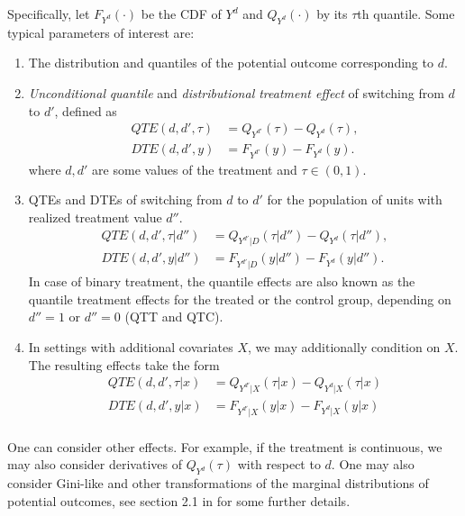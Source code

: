 Specifically, let $F_{Y^d}(\cdot)$ be the CDF of $Y^d$ and   $Q_{Y^d}(\cdot)$ by its   $\tau$th quantile.  Some typical parameters of interest are: 
 \begin{enumerate}
 	\item The distribution and quantiles of the potential outcome corresponding to $d$.
 	\item \emph{Unconditional}  \emph{quantile}  and \emph{distributional  treatment effect} of switching from $d$ to $d'$, defined as
 	\begin{align}
 		QTE(d, d', \tau ) &  =Q_{Y^{d'}}(\tau) - 	Q_{Y^d}(\tau) ,\\
 			DTE(d, d', y) & = F_{Y^{d'}}(y) - F_{Y^d}(y). 
 	\end{align}
 	where $d, d'$ are some values of the treatment and $\tau\in (0, 1)$. 
 	
 	\item  QTEs and DTEs  of switching from $d$ to $d'$ for the population of units with realized treatment value $d''$. 
 	 	\begin{align}
 		QTE(d, d', \tau|d'') &  =Q_{Y^{d'}|D}(\tau|d'') - 	Q_{Y^d}(\tau|d'') ,\\
 		DTE(d, d', y|d'') & = F_{Y^{d'}|D}(y|d'') - F_{Y^d}(y|d''). 
 	\end{align}
 	In case of binary treatment, the quantile effects are also known as the   quantile treatment effects  for the treated or the control group, depending on $d''=1$ or $d''=0$ (QTT and QTC).
 	 
 	 
 	 \item  In settings with additional covariates $X$, we may additionally condition on $X$.  %
 	The resulting effects take the form
 	\begin{align}
 		QTE(d, d', \tau|x) & = Q_{Y^{d'}|X}(\tau|x) - Q_{Y^{d}|X}(\tau|x)\\
 			DTE(d, d', y|x) & = F_{Y^{d'}|X}(y|x) - F_{Y^{d}|X}(y|x)\\
 	\end{align}
 	 
 	
 \end{enumerate}
One can consider other effects. For example, if the treatment is continuous, we may also consider derivatives of $Q_{Y^d}(\tau)$ with respect to $d$. 
 One may also consider Gini-like and other transformations of the marginal distributions of potential outcomes, see section 2.1 in \cite{Chernozhukov2013b} for some further details.
 
